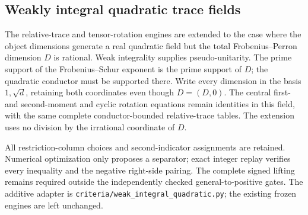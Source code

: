 \subsection{Weakly integral quadratic trace fields}
\label{subsec:m3-weak-quadratic}
The relative-trace and tensor-rotation engines are extended to the case
where the object dimensions generate a real quadratic field but the total
Frobenius--Perron dimension $D$ is rational.  Weak integrality supplies
pseudo-unitarity.  The prime support of the Frobenius--Schur exponent is
the prime support of $D$; the quadratic conductor must be supported there.
Write every dimension in the basis $1,\sqrt d$, retaining both coordinates
even though $D=(D,0)$.  The central first- and second-moment and cyclic
rotation equations remain identities in this field, with the same
complete conductor-bounded relative-trace tables.  The extension uses no
division by the irrational coordinate of $D$.

All restriction-column choices and second-indicator assignments are
retained.  Numerical optimization only proposes a separator; exact integer
replay verifies every inequality and the negative right-side pairing.
The complete signed lifting remains required outside the independently
checked general-to-positive gates.  The additive adapter is
\texttt{criteria/weak\_integral\_quadratic.py}; the existing frozen engines
are left unchanged.
